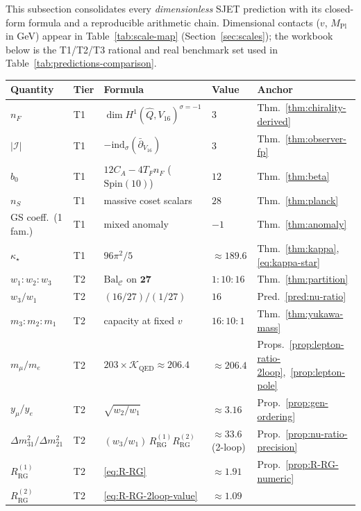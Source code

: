 \documentclass[11pt]{article}
\theoremstyle{plain}
\theoremstyle{definition}
\theoremstyle{remark}
\numberwithin{equation}{section}
\newcommand{\Spin}{\mathrm{Spin}}
\newcommand{\MPl}{M_{\mathrm{Pl}}}
\begin{document}
This subsection consolidates every \emph{dimensionless} SJET prediction with
its closed-form formula and a reproducible arithmetic chain. Dimensional
contacts ($v$, $\MPl$ in GeV) appear in Table~\ref{tab:scale-map}
(Section~\ref{sec:scales}); the workbook below is the T1/T2/T3 rational and
real benchmark set used in Table~\ref{tab:predictions-comparison}.

\begin{table}[ht]
\centering
\small
\renewcommand{\arraystretch}{1.14}
\begin{tabular}{@{}lllll@{}}
\toprule
\textbf{Quantity} & \textbf{Tier} & \textbf{Formula} & \textbf{Value} &
\textbf{Anchor} \\
\midrule
$n_F$ & T1 & $\dim H^1(\hat Q,V_{16})^{\sigma=-1}$ & $3$ &
Thm.~\ref{thm:chirality-derived} \\
$|\mathcal{I}|$ & T1 & $-\mathrm{ind}_\sigma(\bar\partial_{V_{16}})$ & $3$ &
Thm.~\ref{thm:observer-fp} \\
$b_0$ & T1 & $12C_A-4T_Fn_F$ ($\Spin(10)$) & $12$ &
Thm.~\ref{thm:beta} \\
$n_S$ & T1 & massive coset scalars & $28$ &
Thm.~\ref{thm:planck} \\
GS coeff.\ (1 fam.) & T1 & mixed anomaly & $-1$ &
Thm.~\ref{thm:anomaly} \\
$\kappa_\star$ & T1 & $96\pi^2/5$ & $\approx 189.6$ &
Thm.~\ref{thm:kappa}, \eqref{eq:kappa-star} \\
$w_1:w_2:w_3$ & T2 & $\mathrm{Bal}_{\mathcal{C}}$ on $\mathbf{27}$ &
$1:10:16$ &
Thm.~\ref{thm:partition} \\
$w_3/w_1$ & T2 & $(16/27)/(1/27)$ & $16$ &
Pred.~\ref{pred:nu-ratio} \\
$m_3:m_2:m_1$ & T2 & capacity at fixed $v$ & $16:10:1$ &
Thm.~\ref{thm:yukawa-mass} \\
$m_\mu/m_e$ & T2 & $203\times\mathcal{K}_{\mathrm{QED}}\approx206.4$ &
$\approx 206.4$ &
Props.~\ref{prop:lepton-ratio-2loop},~\ref{prop:lepton-pole} \\
$y_\mu/y_e$ & T2 & $\sqrt{w_2/w_1}$ & $\approx 3.16$ &
Prop.~\ref{prop:gen-ordering} \\
$\Delta m^2_{31}/\Delta m^2_{21}$ & T2 &
$(w_3/w_1)\,R_{\mathrm{RG}}^{(1)}R_{\mathrm{RG}}^{(2)}$ &
$\approx 33.6$ (2-loop) &
Prop.~\ref{prop:nu-ratio-precision} \\
$R_{\mathrm{RG}}^{(1)}$ & T2 & \eqref{eq:R-RG} & $\approx 1.91$ &
Prop.~\ref{prop:R-RG-numeric} \\
$R_{\mathrm{RG}}^{(2)}$ & T2 & \eqref{eq:R-RG-2loop-value} & $\approx 1.09$ &

\end{tabular}
\end{table}
\end{document}
